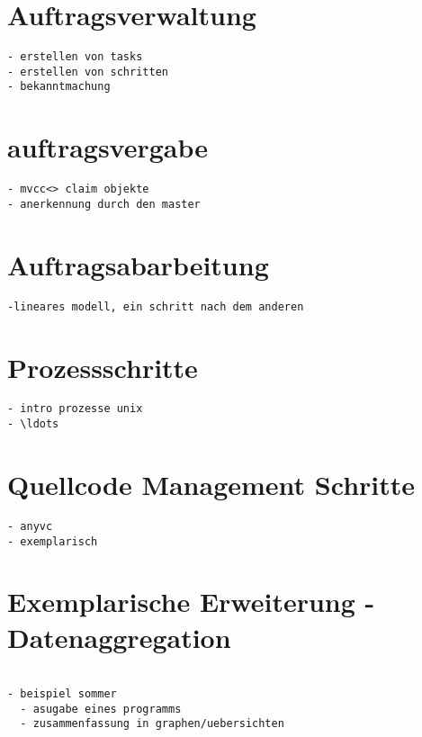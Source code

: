 \section{Auftragsverwaltung}

\begin{verbatim}
- erstellen von tasks
- erstellen von schritten
- bekanntmachung
\end{verbatim}

\section{auftragsvergabe}

\begin{verbatim}
- mvcc<> claim objekte
- anerkennung durch den master

\end{verbatim}

\section{Auftragsabarbeitung}
\begin{verbatim}
-lineares modell, ein schritt nach dem anderen
\end{verbatim}

\section{Prozessschritte}

\begin{verbatim}
- intro prozesse unix
- \ldots
\end{verbatim}

\section{Quellcode Management Schritte}


\begin{verbatim}
- anyvc
- exemplarisch
\end{verbatim}

\section{Exemplarische Erweiterung - Datenaggregation}

\begin{verbatim}

- beispiel sommer
  - asugabe eines programms
  - zusammenfassung in graphen/uebersichten

\end{verbatim}

